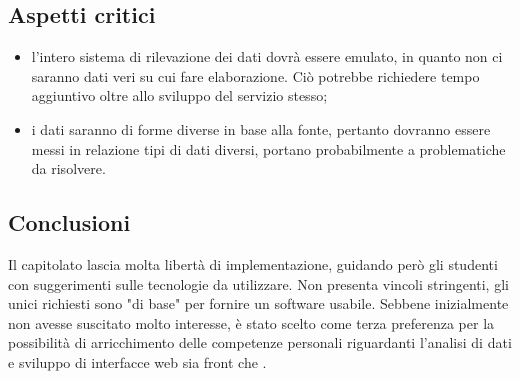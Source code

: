 \subsection{Aspetti critici}
\begin{itemize}
    \item l'intero sistema di rilevazione dei dati dovrà essere emulato, in quanto non ci saranno dati veri su cui fare elaborazione. Ciò potrebbe richiedere tempo aggiuntivo oltre allo sviluppo del servizio stesso;
    \item i dati saranno di forme diverse in base alla fonte, pertanto dovranno essere messi in relazione tipi di dati diversi, portano probabilmente a problematiche da risolvere.
\end{itemize}
\subsection{Conclusioni}
Il capitolato lascia molta libertà di implementazione, guidando per\`{o} gli studenti con suggerimenti sulle tecnologie da utilizzare.
Non presenta vincoli stringenti, gli unici richiesti sono "di base" per fornire un software usabile.
Sebbene inizialmente non avesse suscitato molto interesse, è stato scelto come terza preferenza per la possibilità di arricchimento delle competenze personali
riguardanti l'analisi di dati e sviluppo di interfacce web sia front che .
